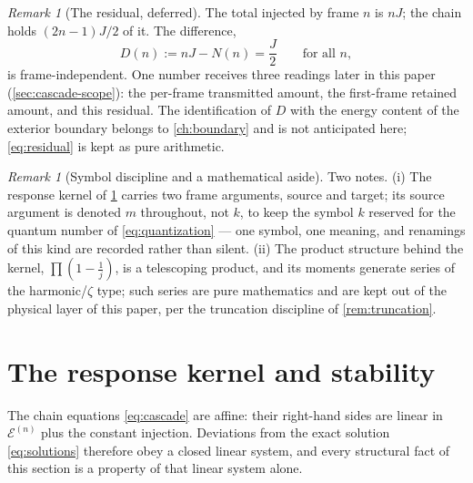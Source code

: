 \documentclass[11pt]{amsbook}
\theoremstyle{plain}
\theoremstyle{definition}
\theoremstyle{remark}
\newtheorem{remark}[theorem]{Remark}
\begin{document}
\begin{remark}[The residual, deferred]\label{rem:residual}
The total injected by frame $n$ is $nJ$; the chain holds $(2n-1)J/2$ of it. The difference,
\begin{equation}\label{eq:residual}
D(n) := nJ - N(n) = \frac{J}{2} \qquad \text{for all } n,
\end{equation}
is frame-independent. One number receives three readings later in this paper (\cref{sec:cascade-scope}): the per-frame transmitted amount, the first-frame retained amount, and this residual. The identification of $D$ with the energy content of the exterior boundary belongs to \cref{ch:boundary} and is not anticipated here; \cref{eq:residual} is kept as pure arithmetic.
\end{remark}

\begin{remark}[Symbol discipline and a mathematical aside]\label{rem:kernel-symbol}
Two notes. (i) The response kernel of \cref{sec:cascade-kernel} carries two frame arguments, source and target; its source argument is denoted $m$ throughout, not $k$, to keep the symbol $k$ reserved for the quantum number of \cref{eq:quantization} --- one symbol, one meaning, and renamings of this kind are recorded rather than silent. (ii) The product structure behind the kernel, $\prod (1 - \tfrac1j)$, is a telescoping product, and its moments generate series of the harmonic/$\zeta$ type; such series are pure mathematics and are kept out of the physical layer of this paper, per the truncation discipline of \cref{rem:truncation}.
\end{remark}

\section{The response kernel and stability}\label{sec:cascade-kernel}

The chain equations \cref{eq:cascade} are affine: their right-hand sides are linear in $\boldsymbol{\mathcal{E}}^{(n)}$ plus the constant injection. Deviations from the exact solution \cref{eq:solutions} therefore obey a closed linear system, and every structural fact of this section is a property of that linear system alone.
\end{document}
